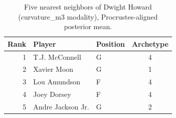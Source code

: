 \begin{table}[htbp]
  \centering\small
  \begin{tabular}{rllc}
    \toprule
    Rank & Player & Position & Archetype \\
    \midrule
    1 & T.J. McConnell & G & 4 \\
    2 & Xavier Moon & G & 1 \\
    3 & Lou Amundson & F & 4 \\
    4 & Joey Dorsey & F & 4 \\
    5 & Andre Jackson Jr. & G & 2 \\
    \bottomrule
  \end{tabular}
  \caption{Five nearest neighbors of Dwight Howard (curvature_m3 modality), Procrustes-aligned posterior mean.}
  \label{tab:Dwight_Howard_neighbors_curvature_m3}
\end{table}

